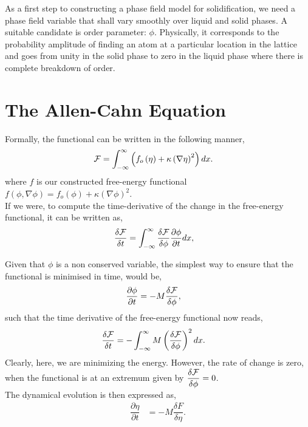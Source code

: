 \documentclass[a4paper]{report}
\begin{document}
As a first step to constructing a phase field model for solidification, we need a phase field variable 
that shall vary smoothly over liquid and solid phases. A suitable candidate is order parameter: $\phi$.
Physically, it corresponds to the probability amplitude of finding an atom at a particular location in 
the lattice and goes from unity in the solid phase to zero in the liquid phase where there is complete 
breakdown of order. 


\section{The Allen-Cahn Equation}

Formally, the functional can be written in the following manner,
\begin{align}
 {\cal F} &= \int_{-\infty}^{\infty}\left(f_o\left(\eta\right) + \kappa\left(\nabla \eta\right)^{2}\right) dx.
\end{align}
where $f$ is our constructed free-energy functional $f\left(\phi,\nabla \phi\right)= 
f_o\left(\phi\right) + \kappa\left(\nabla \phi\right)^{2}$.\\ 

If we were, to compute the time-derivative of the change in the free-energy functional, 
it can be written as, 
\begin{align}
 \dfrac{\delta {\cal F}}{\delta t} &= \int_{-\infty}^{\infty} \dfrac{\delta {\cal F}}{\delta \phi}\dfrac{\partial \phi}{\partial t}dx,
 \label{time_derivative_free_energy}
\end{align}

Given that $\phi$ is a non conserved variable, the simplest way to ensure that the 
functional is minimised in time, would be,
\begin{align}
 \dfrac{\partial \phi}{\partial t} &= -M \dfrac{\delta {\cal F}}{\delta \phi},
\end{align}
such that the time derivative of the free-energy functional now reads, 
\begin{align}
 \dfrac{\delta {\cal F}}{\delta t} &= -\int_{-\infty}^{\infty}M\left(\dfrac{\delta {\cal F}}{\delta \phi}\right)^{2}dx.
\end{align}
Clearly, here, we are minimizing the energy. However, the rate of change is zero, 
when the functional is at an extremum given by $\dfrac{\delta {\cal F}}{\delta \phi} = 0$.\\

The dynamical evolution is then expressed as,
\begin{align}
 \dfrac{\partial \eta}{\partial t} &= -M \dfrac{\delta F}{\delta \eta}.
\end{align}
\end{document}
